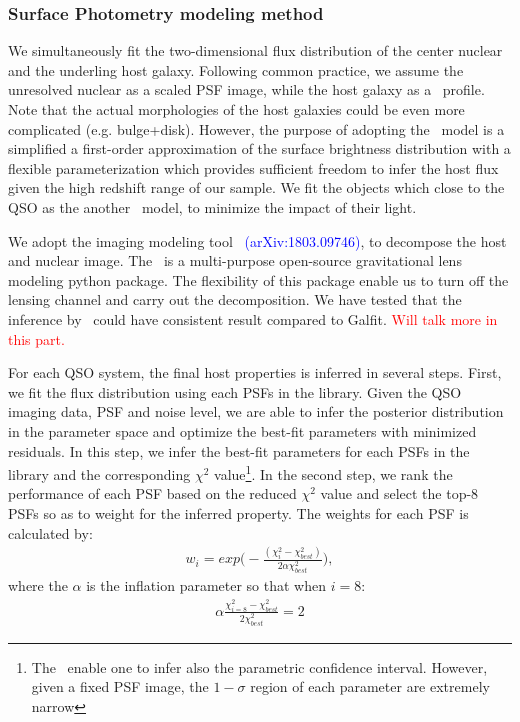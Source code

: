 \documentclass[apj]{emulateapj}
\begin{document}
\subsubsection{Surface Photometry modeling method}
We simultaneously fit the two-dimensional flux distribution of the center nuclear and the underling host galaxy. Following common practice, we assume the unresolved nuclear as a scaled PSF image, while the host galaxy as a \sersic\ profile. Note that the actual morphologies of the host galaxies could be even more complicated (e.g. bulge+disk). However, the purpose of adopting the \sersic\ model is a simplified a first-order approximation of the surface brightness distribution with a flexible parameterization which provides sufficient freedom to infer the host flux given the high redshift range of our sample. We fit the objects which close to the QSO as the another \sersic\ model, to minimize the impact of their light.

We adopt the imaging modeling tool \lenstronomy\ \textcolor{blue}{(arXiv:1803.09746)}, to decompose the host and nuclear image. The \lenstronomy\ is a multi-purpose open-source gravitational lens modeling python package. 
The flexibility of this package enable us to turn off the lensing channel and carry out the decomposition.
We have tested that the inference by \lenstronomy\ could have consistent result compared to {\sc Galfit}. \textcolor{red}{Will talk more in this part.}

For each QSO system, the final host properties is inferred in several steps. First, we fit the flux distribution using each PSFs in the library. Given the QSO imaging data, PSF and noise level, we are able to infer the posterior distribution in the parameter space and optimize the best-fit parameters with minimized residuals. In this step, we infer the best-fit parameters for each PSFs in the library and the corresponding $\chi^2$ value\footnote{The \lenstronomy\ enable one to infer also the parametric confidence interval. However, given a fixed PSF image, the $1-\sigma$ region of each parameter are extremely narrow}. In the second step, we rank the performance of each PSF based on the reduced $\chi^2$ value and select the top-8 PSFs so as to weight for the inferred property. The weights for each PSF is calculated by:
\begin{eqnarray}
\label{eq:weights}
w_i = exp \big(-\frac{ (\chi_i ^2 - \chi_{best} ^2 )}{2\alpha \chi_{best} ^2} \big),
\end{eqnarray} 
where the $\alpha$ is the inflation parameter so that when $i=8$:
\begin{eqnarray}
\label{eq:alpha}
\alpha \frac{ \chi_{i=8} ^2 - \chi_{best} ^2 }{2 \chi_{best} ^2} = 2
\end{eqnarray} 
\end{document}
